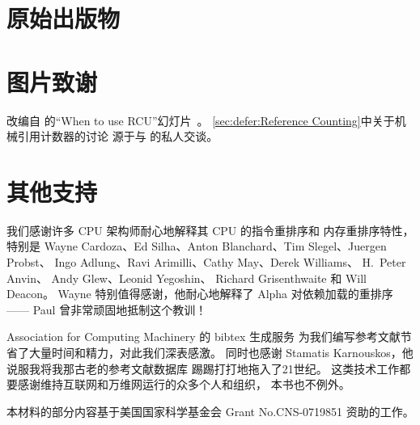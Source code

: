 \section{原始出版物}

\ListOriginalPublications

\section{图片致谢}

\ListContributions

改编自
 的``When to use RCU''幻灯片~\cite{FedorPikus2017RCUthenWhat}。
\cref{sec:defer:Reference Counting}中关于机械引用计数器的讨论
源于与  的私人交谈。

\section{其他支持}

我们感谢许多 CPU 架构师耐心地解释其 CPU 的指令重排序和
内存重排序特性，特别是
Wayne Cardoza、Ed Silha、Anton Blanchard、Tim Slegel、Juergen Probst、
Ingo Adlung、Ravi Arimilli、Cathy May、Derek Williams、
H.~Peter Anvin、
Andy Glew、Leonid Yegoshin、
Richard Grisenthwaite 和 Will Deacon。
Wayne 特别值得感谢，他耐心地解释了 Alpha 对依赖加载的重排序——
Paul 曾非常顽固地抵制这个教训！

Association for Computing Machinery 的 bibtex 生成服务
为我们编写参考文献节省了大量时间和精力，对此我们深表感激。
同时也感谢 Stamatis Karnouskos，他说服我将我那古老的参考文献数据库
踢踢打打地拖入了21世纪。
这类技术工作都要感谢维持互联网和万维网运行的众多个人和组织，
本书也不例外。

本材料的部分内容基于美国国家科学基金会 Grant No.\@ CNS-0719851
资助的工作。
